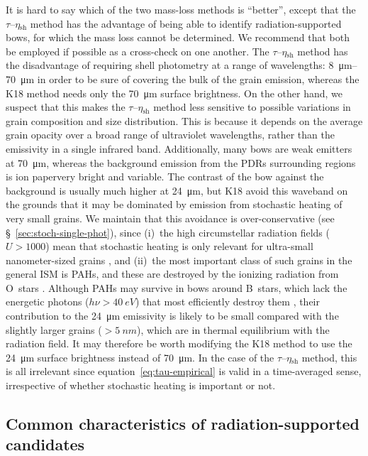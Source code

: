 \documentclass[useAMS, usenatbib, a4paper]{mnras}
\newcommand\shell{\ensuremath{_{\text{sh}}}}
\newcommand\hii{\ion{H}{ii}}
\begin{document}
It is hard to say which of the two mass-loss methods is ``better'',
except that the \(\tau\)--\(\eta\shell\) method has the advantage of
being able to identify radiation-supported bows, for which the mass
loss cannot be determined.  We recommend that both be employed if
possible as a cross-check on one another.  The
\(\tau\)--\(\eta\shell\) method has the disadvantage of requiring
shell photometry at a range of wavelengths: \SIrange{8}{70}{\um} in
order to be sure of covering the bulk of the grain emission, whereas
the K18 method needs only the \SI{70}{\um} surface brightness.  On the
other hand, we suspect that this makes the \(\tau\)--\(\eta\shell\)
method less sensitive to possible variations in grain composition and
size distribution.  This is because it depends on the average grain
opacity over a broad range of ultraviolet wavelengths, rather than the
emissivity in a single infrared band.  Additionally, many bows are
weak emitters at \SI{70}{\um}, whereas the background emission from
the PDRs surrounding \hii{} regions is ion papervery bright and variable.  The
contrast of the bow against the background is usually much higher at
\SI{24}{\um}, but K18 avoid this waveband on the grounds that it may
be dominated by emission from stochastic heating of very small grains.
We maintain that this avoidance is over-conservative (see
\S~\ref{sec:stoch-single-phot}), since (i)~the high circumstellar
radiation fields (\(U > 1000\)) mean that stochastic heating is only
relevant for ultra-small nanometer-sized grains \citep{Draine:2001a},
and (ii)~the most important class of such grains in the general ISM is
PAHs, and these are destroyed by the ionizing radiation from O~stars
\citep{Desert:1990a}.  Although PAHs may survive in bows around
B~stars, which lack the energetic photons (\(h\nu > \SI{40}{eV}\))
that most efficiently destroy them \citep{Lebouteiller:2007a}, their
contribution to the \SI{24}{\um} emissivity is likely to be small
compared with the slightly larger grains (\(> \SI{5}{nm}\)), which are
in thermal equilibrium with the radiation field.  It may therefore be
worth modifying the K18 method to use the \SI{24}{\um} surface
brightness instead of \SI{70}{\um}.  In the case of the
\(\tau\)--\(\eta\shell\) method, this is all irrelevant since
equation~\eqref{eq:tau-empirical} is valid in a time-averaged sense,
irrespective of whether stochastic heating is important or not.


\subsection{Common characteristics of radiation-supported candidates}
\label{sec:comm-prop-cand}
\end{document}
